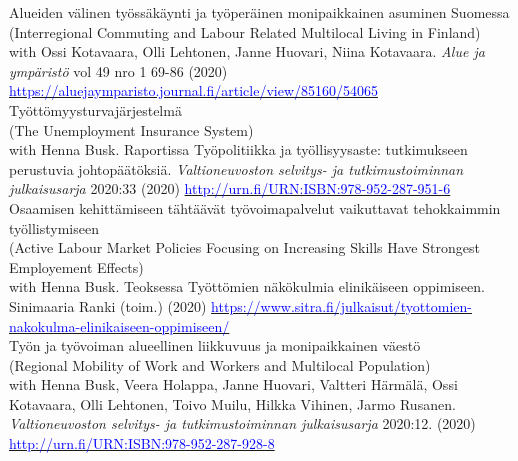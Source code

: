 \documentclass[16pt]{article}
\begin{document}
\noindent Alueiden v\"{a}linen ty\"{o}ss\"{a}k\"{a}ynti ja ty\"{o}per\"{a}inen monipaikkainen asuminen Suomessa \\
\noindent (Interregional Commuting and Labour Related Multilocal Living in Finland) \\
\noindent with Ossi Kotavaara, Olli Lehtonen, Janne Huovari, Niina Kotavaara. \textit{Alue ja ympäristö} vol 49 nro 1 69-86 (2020) \href{https://aluejaymparisto.journal.fi/article/view/85160/54065}{\textcolor{blue}{https://aluejaymparisto.journal.fi/article/view/85160/54065}} \\
 
\noindent Ty\"{o}tt\"{o}myysturvaj\"{a}rjestelm\"{a} \\
\noindent (The Unemployment Insurance System) \\
\noindent with Henna Busk. Raportissa Ty\"{o}politiikka ja ty\"{o}llisyysaste: tutkimukseen perustuvia johtop\"{a}\"{a}t\"{o}ksi\"{a}. \textit{Valtioneuvoston selvitys- ja tutkimustoiminnan julkaisusarja} 2020:33 (2020) \href{http://urn.fi/URN:ISBN:978-952-287-951-6}{\textcolor{blue}{http://urn.fi/URN:ISBN:978-952-287-951-6}} \\

\noindent Osaamisen kehitt\"{a}miseen t\"{a}ht\"{a}\"{a}v\"{a}t ty\"{o}voimapalvelut vaikuttavat tehokkaimmin ty\"{o}llistymiseen \\
\noindent (Active Labour Market Policies Focusing on Increasing Skills Have Strongest Employement Effects) \\
\noindent with Henna Busk. Teoksessa Työttömien näkökulmia elinikäiseen oppimiseen. Sinimaaria Ranki (toim.) (2020) \href{https://www.sitra.fi/julkaisut/tyottomien-nakokulma-elinikaiseen-oppimiseen/}{\textcolor{blue}{https://www.sitra.fi/julkaisut/tyottomien-nakokulma-elinikaiseen-oppimiseen/}} \\

\noindent Ty\"{o}n ja ty\"{o}voiman alueellinen liikkuvuus ja monipaikkainen v\"{a}est\"{o} \\
\noindent (Regional Mobility of Work and Workers and Multilocal Population) \\
\noindent with Henna Busk, Veera Holappa, Janne Huovari, Valtteri H\"{a}rm\"{a}l\"{a}, Ossi Kotavaara, Olli Lehtonen, Toivo Muilu, Hilkka Vihinen, Jarmo Rusanen. \textit{Valtioneuvoston selvitys- ja tutkimustoiminnan julkaisusarja} 2020:12. (2020) \href{http://urn.fi/URN:ISBN:978-952-287-928-8}{\textcolor{blue}{http://urn.fi/URN:ISBN:978-952-287-928-8}} \\
\end{document}
